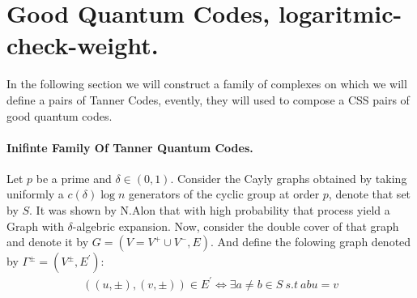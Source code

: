       \section{Good Quantum Codes, logaritmic-check-weight.} 
In the following section we will construct a family of complexes on which we will define a pairs of Tanner Codes, evently, they will used to compose a CSS pairs of good quantum codes.  
  \paragraph{Inifinte Family Of Tanner Quantum Codes.} 
  Let $p$ be a prime and $\delta \in \left( 0,1 \right)$. Consider the Cayly graphs obtained by taking uniformly a $c\left( \delta \right)\log n$ generators of the cyclic group at order $p$, denote that set by $S$. It was shown by N.Alon  that with high probability that process yield a Graph with $\delta$-algebric expansion. Now, consider the double cover of that graph and denote it by $G = \left( V = V^{+} \cup V^{-},E \right)$. And define the folowing graph denoted by $\Gamma^{\pm} = \left(V^{\pm}, E^{\prime}\right)$:
  \begin{equation*}
    \begin{split}
      \left( \left(u , \pm  \right), \left( v, \pm \right) \right) \in  E^{\prime} \Leftrightarrow \exists a\neq b \in S \ s.t \ abu = v     
    \end{split}
  \end{equation*}
     


